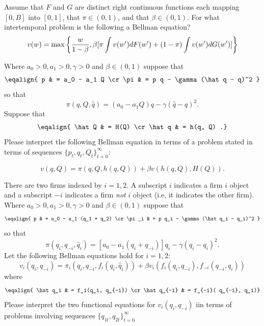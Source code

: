 \medskip



  Assume that  $F$ and $G$ are distinct  right continuous functions each mapping $[0, B]$ into $[0,1]$, that $\pi \in (0,1)$, and  that $\beta \in (0,1)$. For what intertemporal problem is the following a Bellman equation?
$$ v(w) = \max\left\{ {w\over{1-\beta}},  \beta [  \pi \int v(w') d F(w') + (1-\pi) \int v(w') d G(w') ]  \right\} $$


\medskip

 Where $a_0 >0, a_1> 0, \gamma > 0$ and $\beta \in (0,1)$ suppose that
$$\eqalign{ p & = a_0 - a_1 Q \cr
           \pi &  = p q - \gamma(\hat q - q)^2 } $$
so that
$$ \pi(q, Q, \hat q) = (a_0 - a_1 Q)  q - \gamma (\hat q - q)^2 .$$
Suppose that
$$ \eqalign{ \hat Q & = H(Q) \cr
            \hat q & = h(q, Q) .} $$
Please interpret the following Bellman equation in terms of a problem stated in terms of sequences  $\{p_t, q_t, Q_t\}_{t=0}^\infty$:

$$ v(q, Q) = \pi(q,Q, h(q,Q)) + \beta v\left(h(q,Q), H(Q)\right) .$$


\medskip

  There are two firms indexed by $i = 1,2$.  A subscript $i$ indicates a  firm $i$ object  and a subscript $-i$ indicates
a firm {\it not\/} $i$ object (i.e, it indicates the other firm). Where $a_0 >0, a_1> 0, \gamma > 0$ and $\beta \in (0,1)$ suppose that
$$\eqalign{ p & = a_0 - a_1 (q_1 + q_2)  \cr
           \pi_i  &  = p q_i - \gamma(\hat q_i - q_i)^2 } $$
so that
$$ \pi(q_i, q_{-i}, \hat q_i) = [a_0 - a_1 (q_i + q_{-i}) ] q_i - \gamma (\hat q_i - q_i)^2 . $$
Let the following Bellman equations hold for $i=1,2$:
$$ v_i(q_i, q_{-i}) = \pi_i( q_i, q_{-i}, f_i(q_i, \hat q_i)) + \beta v_i(f_i(q_i, q_{-i}), f_{-i}(q_{-i}, q_i) )   $$
where
$$\eqalign{ \hat q_i & = f_i(q_i,  q_{-i}) \cr
                  \hat q_{-i} & = f_{-i}( q_{-i}, q_i)} $$
                  Please interpret the two functional equations for $ v_i(q_i, q_{-i})$ iin terms of problems  involving sequences $\{q_{1t}, q_{2t}\}_{t=0}^\infty$





\bye


\bye

